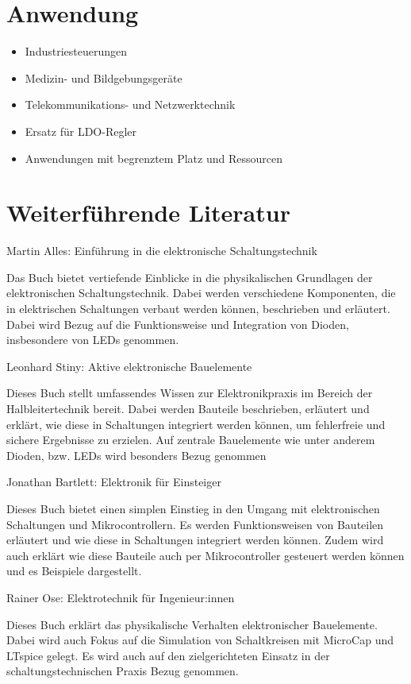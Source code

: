 \section{Anwendung}

\begin{itemize}
	\item Industriesteuerungen
	
	\item Medizin- und Bildgebungsgeräte
	
	\item Telekommunikations- und Netzwerktechnik
	
	\item Ersatz für LDO-Regler
	
	\item Anwendungen mit begrenztem Platz und Ressourcen
\end{itemize}
\cite{MPS:2015}


\section{Weiterführende Literatur}

Martin Alles: Einführung in die elektronische Schaltungstechnik \cite{Alles:2024}

\bigskip  

Das Buch bietet vertiefende Einblicke in die physikalischen Grundlagen der elektronischen Schaltungstechnik. Dabei werden verschiedene Komponenten, die in elektrischen Schaltungen verbaut werden können, beschrieben und erläutert. Dabei wird Bezug auf die Funktionsweise und Integration von Dioden, insbesondere von LEDs genommen. 

\bigskip

Leonhard Stiny: Aktive elektronische Bauelemente \cite{Stiny:2019}

\bigskip

Dieses Buch stellt umfassendes Wissen zur Elektronikpraxis im Bereich der Halbleitertechnik bereit. Dabei werden Bauteile beschrieben, erläutert und erklärt, wie diese in Schaltungen integriert werden können, um fehlerfreie und sichere Ergebnisse zu erzielen. Auf zentrale Bauelemente wie unter anderem Dioden, bzw. LEDs wird besonders Bezug genommen  

\bigskip

Jonathan Bartlett: Elektronik für Einsteiger \cite{Bartlett:2023}

\bigskip

Dieses Buch bietet einen simplen Einstieg in den Umgang mit elektronischen Schaltungen und Mikrocontrollern. Es werden Funktionsweisen von Bauteilen erläutert und wie diese in Schaltungen integriert werden können. Zudem wird auch erklärt wie diese Bauteile auch per Mikrocontroller gesteuert werden können und es Beispiele dargestellt.  

\bigskip

Rainer Ose: Elektrotechnik für Ingenieur:innen \cite{Ose:2022}

\bigskip

Dieses Buch erklärt das physikalische Verhalten elektronischer Bauelemente. Dabei wird auch Fokus auf die Simulation von Schaltkreisen mit MicroCap und LTspice gelegt. Es wird auch auf den zielgerichteten Einsatz in der schaltungstechnischen Praxis Bezug genommen.